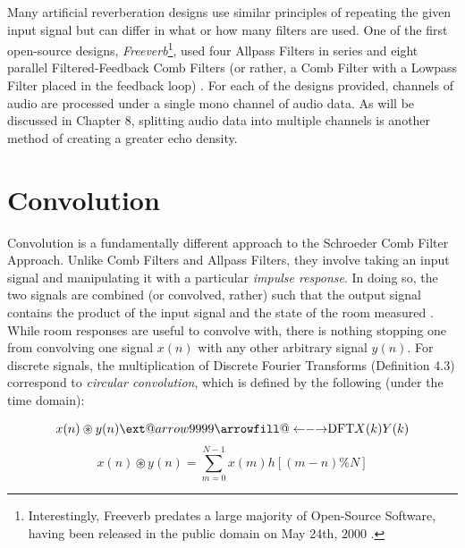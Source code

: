 Many artificial reverberation designs use similar principles of repeating the given input signal but can differ in what or how many filters are used. One of the first open-source designs, \textit{Freeverb}\footnote{Interestingly, Freeverb predates a large majority of Open-Source Software, having been released in the public domain on May 24th, 2000 \cite{freeverb}.}, used four Allpass Filters in series and eight parallel Filtered-Feedback Comb Filters (or rather, a Comb Filter with a Lowpass Filter placed in the feedback loop) \cite{PASPWEB2010}. For each of the designs provided, channels of audio are processed under a single mono channel of audio data. As will be discussed in Chapter 8, splitting audio data into multiple channels is another method of creating a greater echo density.

\section{Convolution}
Convolution is a fundamentally different approach to the Schroeder Comb Filter Approach. Unlike Comb Filters and Allpass Filters, they involve taking an input signal and manipulating it with a particular \textit{impulse response}. In doing so, the two signals are combined (or convolved, rather) such that the output signal contains the product of the input signal and the state of the room measured \cite{pirkle2019designing}. While room responses are useful to convolve with, there is nothing stopping one from convolving one signal $x(n)$ with any other arbitrary signal $y(n)$. For discrete signals, the multiplication of Discrete Fourier Transforms (Definition 4.3) correspond to \textit{circular convolution}, which is defined by the following (under the time domain):

\makeatletter
\newcommand\xleftrightarrow[2][]{%
  \ext@arrow 9999{\longleftrightarrowfill@}{#1}{#2}}
\newcommand\longleftrightarrowfill@{%
  \arrowfill@\leftarrow\relbar\rightarrow}
\makeatother

\begin{defn}\label{def-cir-FT}
	\begin{equation}\label{eq-cir-FT)}
	x(n) \circledast y(n) \xleftrightarrow{\text{DFT}} X(k)Y(k)
	\end{equation}
	\begin{equation}\label{next-ig}
	x(n) \circledast y(n) = \sum_{m=0}^{N-1} x(m) h[(m - n) \% N]
	\end{equation}
\end{defn}

